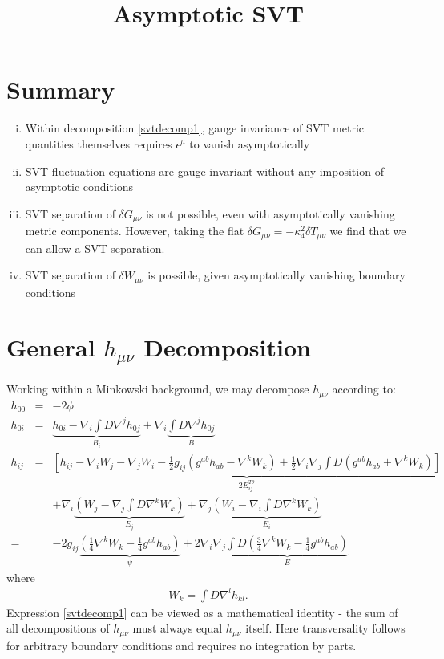 \documentclass[10pt,letterpaper]{article}
\title{Asymptotic SVT}
\date{}
\numberwithin{equation}{section}
\begin{document}
 
\maketitle
\noindent 
%
\section*{Summary}
\begin{enumerate}[i.]
\item Within decomposition \eqref{svtdecomp1}, gauge invariance of SVT metric quantities themselves requires $\epsilon^\mu$ to vanish asymptotically
\item SVT fluctuation equations are gauge invariant without any imposition of asymptotic conditions
\item SVT separation of $\delta G_{\mu\nu}$ is not possible, even with asymptotically vanishing metric components. However, taking the flat $\delta G_{\mu\nu} = -\kappa^2_4\delta T_{\mu\nu}$ we find that we can allow a SVT separation. 
\item SVT separation of $\delta W_{\mu\nu}$ is possible, given asymptotically vanishing boundary conditions
\end{enumerate}
%
%
\section{General $h_{\mu\nu}$ Decomposition} 
%
%
Working within a Minkowski background, we may decompose $h_{\mu\nu}$ according to:
\begin{eqnarray}
h_{00} &=& -2\phi
\nonumber\\
h_{0i}&=& \underbrace{h_{0i}-\nabla_i \int D \nabla^j h_{0j}}_{B_i} + \nabla_i \underbrace{\int D\nabla^j h_{0j}}_{B}
\nonumber\\
h_{ij}&=&\underbrace{\left[ h_{ij} - \nabla_i W_j - \nabla_j W_i - \frac12 g_{ij}(g^{ab}h_{ab}-\nabla^k W_k) + \frac12 \nabla_i \nabla_j \int D(g^{ab}h_{ab}+\nabla^k W_k) \right]}_{2E^{T\theta}_{ij}}
\nonumber\\
&& + \nabla_i \underbrace{\left(W_j - \nabla_j \int D \nabla^k W_k\right)}_{E_j}+
\nabla_j \underbrace{\left(W_i - \nabla_i \int D \nabla^k W_k\right)}_{E_i}
\nonumber\\=
&&
-2 g_{ij}\underbrace{(\tfrac14\nabla^k W_k-\tfrac14 g^{ab}h_{ab} )}_{\psi}
+2\nabla_i\nabla_j \underbrace{\int D (\tfrac34 \nabla^k  W_{k}-\tfrac14 g^{ab}h_{ab} )}_{E}
\label{svtdecomp1}
\end{eqnarray}
where
\begin{eqnarray}
W_k = \int D \nabla^l h_{kl}.
\end{eqnarray}
Expression \eqref{svtdecomp1} can be viewed as a mathematical identity - the sum of all decompositions of $h_{\mu\nu}$ must always equal $h_{\mu\nu}$ itself. Here transversality follows for arbitrary boundary conditions and requires no integration by parts.
%
%
\end{document}
